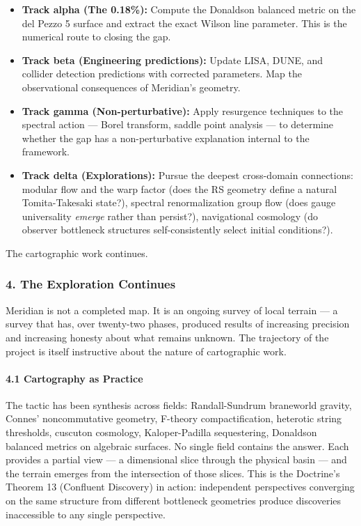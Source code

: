 \begin{itemize}[nosep,leftmargin=*]
  \item \textbf{Track alpha (The 0.18\%):} Compute the Donaldson balanced metric on the del Pezzo 5 surface and extract the exact Wilson line parameter. This is the numerical route to closing the gap.
  \item \textbf{Track beta (Engineering predictions):} Update LISA, DUNE, and collider detection predictions with corrected parameters. Map the observational consequences of Meridian's geometry.
  \item \textbf{Track gamma (Non-perturbative):} Apply resurgence techniques to the spectral action — Borel transform, saddle point analysis — to determine whether the gap has a non-perturbative explanation internal to the framework.
  \item \textbf{Track delta (Explorations):} Pursue the deepest cross-domain connections: modular flow and the warp factor (does the RS geometry define a natural Tomita-Takesaki state?), spectral renormalization group flow (does gauge universality \textit{emerge} rather than persist?), navigational cosmology (do observer bottleneck structures self-consistently select initial conditions?).
\end{itemize}


The cartographic work continues.


\bigskip\noindent\makebox[\textwidth]{\color{rulegray}\rule{5cm}{0.3pt}}\bigskip


\subsubsection*{4. The Exploration Continues}


Meridian is not a completed map. It is an ongoing survey of local terrain — a survey that has, over twenty-two phases, produced results of increasing precision and increasing honesty about what remains unknown. The trajectory of the project is itself instructive about the nature of cartographic work.


\paragraph*{4.1 Cartography as Practice}


The tactic has been synthesis across fields: Randall-Sundrum braneworld gravity, Connes' noncommutative geometry, F-theory compactification, heterotic string thresholds, cuscuton cosmology, Kaloper-Padilla sequestering, Donaldson balanced metrics on algebraic surfaces. No single field contains the answer. Each provides a partial view — a dimensional slice through the physical basin — and the terrain emerges from the intersection of those slices. This is the Doctrine's Theorem 13 (Confluent Discovery) in action: independent perspectives converging on the same structure from different bottleneck geometries produce discoveries inaccessible to any single perspective.


